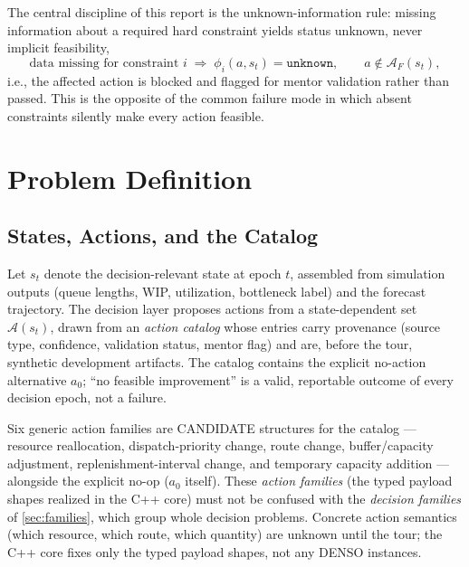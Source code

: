 \documentclass[11pt,a4paper]{article}
\newcommand{\Acal}{\mathcal{A}}
\begin{document}
The central discipline of this report is the unknown-information rule: missing
information about a required hard constraint yields status unknown, never
implicit feasibility,
\begin{equation}\label{eq:unknownrule}
\text{data missing for constraint } i
\;\Longrightarrow\;
\phi_i(a,s_t)=\texttt{unknown},
\qquad
a \notin \Acal_F(s_t),
\end{equation}
i.e., the affected action is blocked and flagged for mentor validation rather
than passed. This is the opposite of the common failure mode in which absent
constraints silently make every action feasible.

\section{Problem Definition}\label{sec:problem}

\subsection{States, Actions, and the Catalog}\label{sec:actions}

Let $s_t$ denote the decision-relevant state at epoch $t$, assembled from
simulation outputs (queue lengths, WIP, utilization, bottleneck label) and
the forecast trajectory. The decision layer proposes actions from a
state-dependent set $\Acal(s_t)$, drawn from an \emph{action catalog} whose
entries carry provenance (source type, confidence, validation status, mentor
flag) and are, before the tour, synthetic development artifacts. The catalog
contains the explicit no-action alternative $a_0$; ``no feasible
improvement'' is a valid, reportable outcome of every decision epoch, not a
failure.

Six generic action families are CANDIDATE structures for the catalog ---
resource reallocation, dispatch-priority change, route change,
buffer/capacity adjustment, replenishment-interval change, and temporary
capacity addition --- alongside the explicit no-op ($a_0$ itself). These
\emph{action families} (the typed payload shapes realized in the C++ core)
must not be confused with the \emph{decision families} of
\cref{sec:families}, which group whole decision problems. Concrete action
semantics (which resource, which route, which quantity) are unknown until
the tour; the C++ core fixes only the typed payload shapes, not any DENSO
instances.
\end{document}
